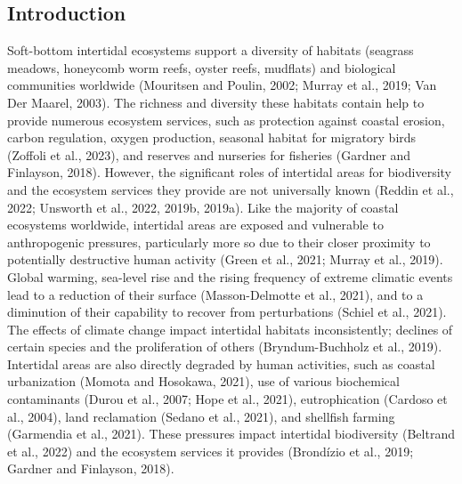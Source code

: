\documentclass[
  letterpaper,
  11pt,
  english,
  singlespacing,
  headsepline]{MastersDoctoralThesis}
\begin{document}
\begin{spacing}{1.5}

\section{Introduction}\label{introduction-1}

Soft-bottom intertidal ecosystems support a diversity of habitats
(seagrass meadows, honeycomb worm reefs, oyster reefs, mudflats) and
biological communities worldwide (Mouritsen and Poulin, 2002; Murray et
al., 2019; Van Der Maarel, 2003). The richness and diversity these
habitats contain help to provide numerous ecosystem services, such as
protection against coastal erosion, carbon regulation, oxygen
production, seasonal habitat for migratory birds (Zoffoli et al., 2023),
and reserves and nurseries for fisheries (Gardner and Finlayson, 2018).
However, the significant roles of intertidal areas for biodiversity and
the ecosystem services they provide are not universally known (Reddin et
al., 2022; Unsworth et al., 2022, 2019b, 2019a). Like the majority of
coastal ecosystems worldwide, intertidal areas are exposed and
vulnerable to anthropogenic pressures, particularly more so due to their
closer proximity to potentially destructive human activity (Green et
al., 2021; Murray et al., 2019). Global warming, sea-level rise and the
rising frequency of extreme climatic events lead to a reduction of their
surface (Masson-Delmotte et al., 2021), and to a diminution of their
capability to recover from perturbations (Schiel et al., 2021). The
effects of climate change impact intertidal habitats inconsistently;
declines of certain species and the proliferation of others
(Bryndum-Buchholz et al., 2019). Intertidal areas are also directly
degraded by human activities, such as coastal urbanization (Momota and
Hosokawa, 2021), use of various biochemical contaminants (Durou et al.,
2007; Hope et al., 2021), eutrophication (Cardoso et al., 2004), land
reclamation (Sedano et al., 2021), and shellfish farming (Garmendia et
al., 2021). These pressures impact intertidal biodiversity (Beltrand et
al., 2022) and the ecosystem services it provides (Brondízio et al.,
2019; Gardner and Finlayson, 2018).


\end{spacing}
\end{document}
